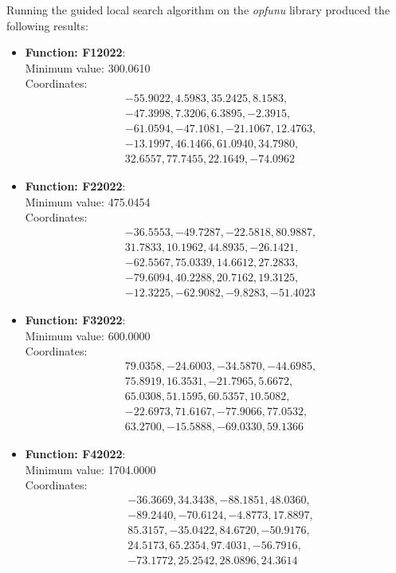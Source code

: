 \documentclass{article}
\begin{document}
Running the guided local search algorithm on the \textit{opfunu} library
produced the following results:

\begin{itemize}
  \item \textbf{Function: F12022}: \\
    Minimum value: 300.0610 \\
    Coordinates:
    \[
      \begin{aligned}
        & -55.9022, 4.5983, 35.2425, 8.1583, \\
        & -47.3998, 7.3206, 6.3895, -2.3915, \\
        & -61.0594, -47.1081, -21.1067, 12.4763, \\
        & -13.1997, 46.1466, 61.0940, 34.7980, \\
        & 32.6557, 77.7455, 22.1649, -74.0962
      \end{aligned}
    \]

  \item \textbf{Function: F22022}: \\
    Minimum value: 475.0454 \\
    Coordinates:
    \[
      \begin{aligned}
        & -36.5553, -49.7287, -22.5818, 80.9887, \\
        & 31.7833, 10.1962, 44.8935, -26.1421, \\
        & -62.5567, 75.0339, 14.6612, 27.2833, \\
        & -79.6094, 40.2288, 20.7162, 19.3125, \\
        & -12.3225, -62.9082, -9.8283, -51.4023
      \end{aligned}
    \]

  \item \textbf{Function: F32022}: \\
    Minimum value: 600.0000 \\
    Coordinates:
    \[
      \begin{aligned}
        & 79.0358, -24.6003, -34.5870, -44.6985, \\
        & 75.8919, 16.3531, -21.7965, 5.6672, \\
        & 65.0308, 51.1595, 60.5357, 10.5082, \\
        & -22.6973, 71.6167, -77.9066, 77.0532, \\
        & 63.2700, -15.5888, -69.0330, 59.1366
      \end{aligned}
    \]

  \item \textbf{Function: F42022}: \\
    Minimum value: 1704.0000 \\
    Coordinates:
    \[
      \begin{aligned}
        & -36.3669, 34.3438, -88.1851, 48.0360, \\
        & -89.2440, -70.6124, -4.8773, 17.8897, \\
        & 85.3157, -35.0422, 84.6720, -50.9176, \\
        & 24.5173, 65.2354, 97.4031, -56.7916, \\
        & -73.1772, 25.2542, 28.0896, 24.3614
      \end{aligned}
    \]


\end{itemize}
\end{document}
